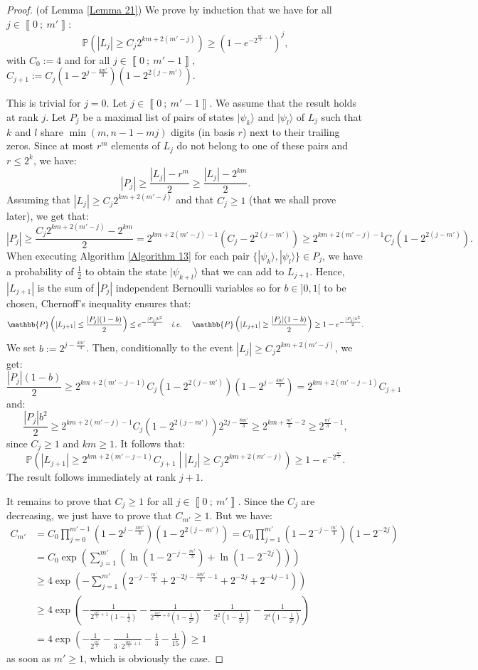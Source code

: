 \documentclass[a4paper,10pt,notitlepage]{report}
\theoremstyle{definition}
\theoremstyle{plain}
\theoremstyle{definition}
\newcommand{\ie}{\emph{i.e.}\ }
\renewcommand{\i}[2]{\left\llbracket #1~;~#2\right\rrbracket}
\renewcommand{\(}{\left(}
\renewcommand{\)}{\right)}
\renewcommand{\P}{\mathbb{P}}
\begin{document}
\begin{proof} (of Lemma \ref{Lemma 21})
We prove by induction that we have for all $j\in\i{0}{m'}$:
\[\P\(|L_j|\geq C_j 2^{km+2(m'-j)}\)\geq \(1-e^{-2^{\frac{m'}{3}-1}}\)^j,\]
with $C_0:=4$ and for all $j\in\i{0}{m'-1}$, $C_{j+1}:=C_j(1-2^{j-\frac{4m'}{3}})(1-2^{2(j-m')})$. 

This is trivial for $j=0$. Let $j\in\i{0}{m'-1}$. We assume that the result holds at rank $j$. Let $P_j$ be a maximal list of pairs of states $|\psi_k\rangle$ and $|\psi_l\rangle$ of $L_j$ such that $k$ and $l$ share $\min(m,n-1-mj)$ digits (in basis $r$) next to their trailing zeros. Since at most $r^m$ elements of $L_j$ do not belong to one of these pairs and $r\leq 2^k$, we have:
\[|P_j|\geq \frac{|L_j|-r^m}{2}\geq \frac{|L_j|-2^{km}}{2}.\]
Assuming that $|L_j|\geq C_j 2^{km+2(m'-j)}$ and that $C_j\geq 1$ (that we shall prove later), we get that:
\[|P_j|\geq \frac{C_j 2^{km+2(m'-j)} -2^{km}}{2}=2^{km+2(m'-j)-1}(C_j-2^{2(j-m')})\geq 2^{km+2(m'-j)-1}C_j(1-2^{2(j-m')}) .\] 
When executing Algorithm \ref{Algorithm 13} for each pair $\{|\psi_k\rangle, |\psi_l\rangle\}\in P_j$, we have a probability of $\frac{1}{2}$ to obtain the state $|\psi_{k+l}\rangle$ that we can add to $L_{j+1}$. Hence, $|L_{j+1}|$ is the sum of $|P_j|$ independent Bernoulli variables so for $b\in]0,1[$ to be chosen, Chernoff's inequality ensures that:
\[\P\(|L_{j+1}|\leq \frac{|P_j|(1-b)}{2}\)\leq e^{-\frac{|P_j|b^2}{2}} \quad \mbox{\ie} \quad \P\(|L_{j+1}|\geq \frac{|P_j|(1-b)}{2}\)\geq 1-e^{-\frac{|P_j|b^2}{2}}.\]
We set $b:=2^{j-\frac{4m'}{3}}$. Then, conditionally to the event $|L_j|\geq C_j 2^{km+2(m'-j)}$, we get:
\[\frac{|P_j|(1-b)}{2}\geq 2^{km+2(m'-j-1)}C_j(1-2^{2(j-m')})(1-2^{j-\frac{4m'}{3}})= 2^{km+2(m'-j-1)}C_{j+1}\]
and:
\[\frac{|P_j|b^2}{2}\geq 2^{km+2(m'-j)-1}C_j(1-2^{2(j-m')})2^{2j-\frac{8m'}{3}}\geq 2^{km+\frac{m'}{3}-2}\geq 2^{\frac{m'}{3}-1},\]
since $C_j\geq 1$ and $km\geq 1$. It follows that:
\[\P\(|L_{j+1}|\geq 2^{km+2(m'-j-1)}C_{j+1}\middle| |L_j|\geq C_j 2^{km+2(m'-j)} \)\geq 1-e^{-2^{\frac{m'}{3}}}.\]
The result follows immediately at rank $j+1$. 

It remains to prove that $C_j\geq 1$ for all $j\in\i{0}{m'}$. Since the $C_j$ are decreasing, we just have to prove that $C_{m'}\geq 1$. But we have:
\begin{align*}
C_{m'}&=C_0\prod_{j=0}^{m'-1}\(1-2^{j-\frac{4m'}{3}}\)\(1-2^{2(j-m')}\)=C_0\prod_{j=1}^{m'}\(1-2^{-j-\frac{m'}{3}}\)\(1-2^{-2j}\)\\
&=C_0\exp\(\sum_{j=1}^{m'}\(\ln\(1-2^{-j-\frac{m'}{3}}\)+\ln\(1-2^{-2j}\)\)\)\\
&\geq 4\exp\(-\sum_{j=1}^{m'}\(2^{-j-\frac{m'}{3}}+2^{-2j-\frac{4m'}{3}-1}+2^{-2j}+2^{-4j-1}\)\)\\
&\geq 4\exp\(-\frac{1}{2^{\frac{m'}{3}+1}\(1-\frac{1}{2}\)}-\frac{1}{2^{\frac{4m'}{3}+3}\(1-\frac{1}{2^2}\)}-\frac{1}{2^{2}\(1-\frac{1}{2^2}\)}-\frac{1}{2^{4}\(1-\frac{1}{2^4}\)}\)\\
&= 4\exp\(-\frac{1}{2^{\frac{m'}{3}}}-\frac{1}{3\cdot 2^{\frac{4m'}{3}+1}}-\frac{1}{3}-\frac{1}{15}\)\geq 1
\end{align*}
as soon as $m'\geq 1$, which is obviously the case.
\end{proof}
\end{document}
